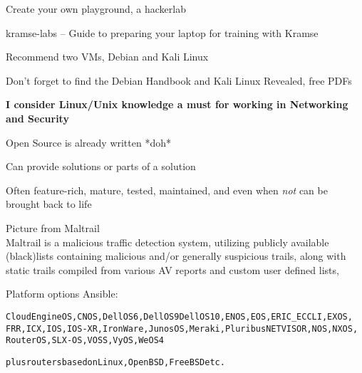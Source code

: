 \documentclass[Screen16to9,17pt]{foils}
\begin{document}


\begin{list2}
\item Create your own playground, a hackerlab
\item kramse-labs -- Guide to preparing your laptop for training with Kramse\\
\item Recommend two VMs, Debian and Kali Linux
\item Don't forget to find the Debian Handbook and Kali Linux Revealed, free PDFs
\end{list2}


{\bf I consider Linux/Unix knowledge a must for working in Networking and Security}



\begin{list2}
\item Open Source is already written *doh*
\item Can provide solutions or parts of a solution
\item Often feature-rich, mature, tested, maintained, and even when \emph{not} can be brought back to life
\item Picture from Maltrail \\
Maltrail is a malicious traffic detection system, utilizing publicly available (black)lists containing malicious and/or generally suspicious trails, along with static trails compiled from various AV reports and custom user defined lists,
\end{list2}






Platform options Ansible:
\begin{alltt}
CloudEngine OS, CNOS, Dell OS6, Dell OS9 Dell OS10, ENOS, EOS, ERIC_ECCLI, EXOS,
FRR, ICX, IOS, IOS-XR, IronWare, Junos OS, Meraki, Pluribus NETVISOR, NOS, NXOS,
RouterOS, SLX-OS, VOSS, VyOS, WeOS 4

plus routers based on Linux, OpenBSD, FreeBSD etc.
\end{alltt}
\end{document}
